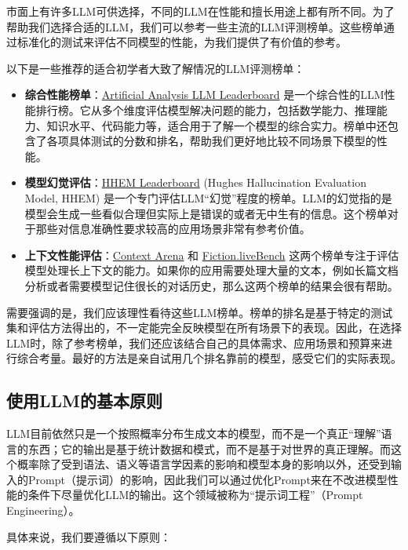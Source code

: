 \documentclass[../main.tex]{subfiles}
\begin{document}
市面上有许多LLM可供选择，不同的LLM在性能和擅长用途上都有所不同。为了帮助我们选择合适的LLM，我们可以参考一些主流的LLM评测榜单。这些榜单通过标准化的测试来评估不同模型的性能，为我们提供了有价值的参考。

以下是一些推荐的适合初学者大致了解情况的LLM评测榜单：

\begin{itemize}
  \item \textbf{综合性能榜单}：\href{https://artificialanalysis.ai/leaderboards/models}{Artificial Analysis LLM Leaderboard} 是一个综合性的LLM性能排行榜。它从多个维度评估模型解决问题的能力，包括数学能力、推理能力、知识水平、代码能力等，适合用于了解一个模型的综合实力。榜单中还包含了各项具体测试的分数和排名，帮助我们更好地比较不同场景下模型的性能。
  \item \textbf{模型幻觉评估}：\href{https://vectara-leaderboard.hf.space/}{HHEM Leaderboard} (Hughes Hallucination Evaluation Model, HHEM) 是一个专门评估LLM“幻觉”程度的榜单。LLM的幻觉指的是模型会生成一些看似合理但实际上是错误的或者无中生有的信息。这个榜单对于那些对信息准确性要求较高的应用场景非常有参考价值。
  \item \textbf{上下文性能评估}：\href{https://contextarena.ai/}{Context Arena} 和 \href{https://fiction.live/stories/Fiction-liveBench-May-22-2025/oQdzQvKHw8JyXbN87}{Fiction.liveBench} 这两个榜单专注于评估模型处理长上下文的能力。如果你的应用需要处理大量的文本，例如长篇文档分析或者需要模型记住很长的对话历史，那么这两个榜单的结果会很有帮助。
\end{itemize}

需要强调的是，我们应该理性看待这些LLM榜单。榜单的排名是基于特定的测试集和评估方法得出的，不一定能完全反映模型在所有场景下的表现。因此，在选择LLM时，除了参考榜单，我们还应该结合自己的具体需求、应用场景和预算来进行综合考量。最好的方法是亲自试用几个排名靠前的模型，感受它们的实际表现。

\subsection{使用LLM的基本原则}

LLM目前依然只是一个按照概率分布生成文本的模型，而不是一个真正“理解”语言的东西；它的输出是基于统计数据和模式，而不是基于对世界的真正理解。而这个概率除了受到语法、语义等语言学因素的影响和模型本身的影响以外，还受到输入的Prompt（提示词）的影响，因此我们可以通过优化Prompt来在不改进模型性能的条件下尽量优化LLM的输出。这个领域被称为“提示词工程”（Prompt Engineering）。

具体来说，我们要遵循以下原则：
\end{document}
